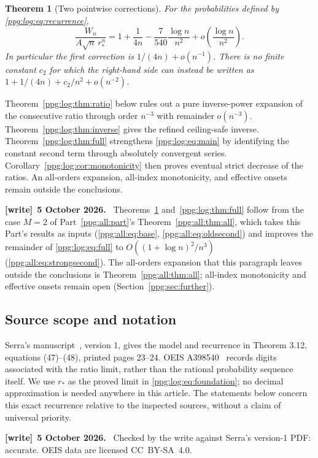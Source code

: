 \documentclass[11pt,letterpaper]{article}
\newtheorem{theorem}{Theorem}[section]
\theoremstyle{remark}\newtheorem{remark}[theorem]{Remark}
\numberwithin{equation}{section}
\newenvironment{writenote}[1][]{\par\smallskip\begingroup\small
 \noindent\textbf{[write]}\if\relax\detokenize{#1}\relax\else~\textbf{#1.}\fi\ }%
 {\par\endgroup\smallskip}
\begin{document}
\begin{theorem}[Two pointwise corrections]\label{ppg:log:thm:main}
For the probabilities defined by \eqref{ppg:log:eq:recurrence},
\begin{equation}\label{ppg:log:eq:main}
 \frac{W_n}{A\sqrt n\,r_*^n}
 =1+\frac1{4n}-\frac7{540}\frac{\log n}{n^2}
   +o\!\left(\frac{\log n}{n^2}\right).
\end{equation}
In particular the first correction is $1/(4n)+o(n^{-1})$. There is no finite constant $c_2$ for which the right-hand side can instead be written as
$1+1/(4n)+c_2/n^2+o(n^{-2})$.
\end{theorem}

Theorem~\ref{ppg:log:thm:ratio} below rules out a pure inverse-power expansion of the consecutive ratio through order $n^{-3}$ with remainder $o(n^{-3})$. Theorem~\ref{ppg:log:thm:inverse} gives the refined ceiling-safe inverse. Theorem~\ref{ppg:log:thm:full} strengthens \eqref{ppg:log:eq:main} by identifying the constant second term through absolutely convergent series. Corollary~\ref{ppg:log:cor:monotonicity} then proves eventual strict decrease of the ratios. An all-orders expansion, all-index monotonicity, and effective onsets remain outside the conclusions.
\begin{writenote}[5 October 2026]
Theorems~\ref{ppg:log:thm:main} and~\ref{ppg:log:thm:full} follow from the case $M=2$ of Part~\ref{ppg:all:part}'s Theorem~\ref{ppg:all:thm:all}, which takes this Part's results as inputs (\eqref{ppg:all:eq:base}, \eqref{ppg:all:eq:oldsecond}) and improves the remainder of \eqref{ppg:log:eq:full} to $O((1+\log n)^2/n^3)$ (\eqref{ppg:all:eq:strongsecond}). The all-orders expansion that this paragraph leaves outside the conclusions is Theorem~\ref{ppg:all:thm:all}; all-index monotonicity and effective onsets remain open (Section~\ref{ppg:sec:further}).
\end{writenote}

\subsection{Source scope and notation}\label{ppg:log:sub:scope}
Serra's manuscript~\cite{serra}, version 1, gives the model and recurrence in Theorem 3.12, equations (47)--(48), printed pages 23--24. OEIS A398540~\cite{oeis} records digits associated with the ratio limit, rather than the rational probability sequence itself. We use $r_*$ as the proved limit in \eqref{ppg:log:eq:foundation}; no decimal approximation is needed anywhere in this article. The statements below concern this exact recurrence relative to the inspected sources, without a claim of universal priority.
\begin{writenote}[5 October 2026]
Checked by the write against Serra's version-1 PDF: accurate. OEIS data are licensed CC~BY-SA~4.0.
\end{writenote}
\end{document}

